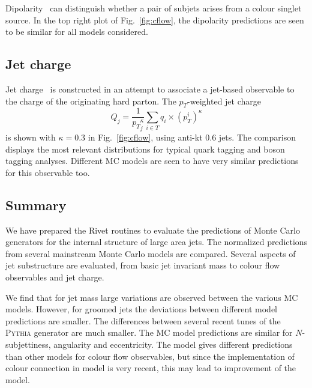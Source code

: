 Dipolarity~\cite{Hook:2011cq} can distinguish whether a pair of subjets arises
from a colour singlet source. In the top right plot of Fig.~\ref{fig:cflow}, 
the dipolarity predictions are seen to be similar for all models considered.


\subsection{Jet charge}

Jet charge~\cite{Feynman1978,Waalewijn2012,Krohn2012} is constructed 
in an attempt to associate a jet-based observable to the charge of the 
originating hard parton. The $p_T$-weighted jet charge
\[
Q_j = \frac{1}{{p_T}_j^\kappa}\sum_{i\in T} q_i\times (p_T^i)^\kappa \]
is shown with $\kappa=0.3$ in Fig.~\ref{fig:cflow}, using anti-kt $0.6$ jets.
The comparison displays the most relevant distributions for typical quark tagging and boson tagging analyses.
Different MC models are seen to have very similar predictions for this observable too.

\subsection{Summary}


We have prepared the Rivet routines to evaluate the predictions of 
Monte Carlo generators for the internal structure of large 
area jets. The normalized predictions from several mainstream
Monte Carlo models are compared. Several aspects of jet substructure 
are evaluated, from basic jet invariant mass to colour flow observables 
and jet charge.

We find that for jet mass large variations are observed 
between the various MC models. 
However, for groomed jets the deviations between different model predictions 
are smaller. The differences between several recent tunes of the 
\textsc{Pythia} generator are much smaller.
The MC model predictions are similar for $N$-subjettiness, angularity 
and eccentricity. The \hpp model gives different predictions than other models 
for colour flow observables, but since the implementation of colour 
connection in \hpp model is very recent, this may lead to improvement 
of the model.


